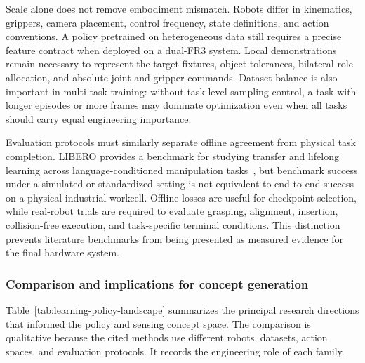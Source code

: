 Scale alone does not remove embodiment mismatch. Robots differ in kinematics, grippers, camera placement, control frequency, state definitions, and action conventions. A policy pretrained on heterogeneous data still requires a precise feature contract when deployed on a dual-FR3 system. Local demonstrations remain necessary to represent the target fixtures, object tolerances, bilateral role allocation, and absolute joint and gripper commands. Dataset balance is also important in multi-task training: without task-level sampling control, a task with longer episodes or more frames may dominate optimization even when all tasks should carry equal engineering importance.

Evaluation protocols must similarly separate offline agreement from physical task completion. LIBERO provides a benchmark for studying transfer and lifelong learning across language-conditioned manipulation tasks~\cite{libero}, but benchmark success under a simulated or standardized setting is not equivalent to end-to-end success on a physical industrial workcell. Offline losses are useful for checkpoint selection, while real-robot trials are required to evaluate grasping, alignment, insertion, collision-free execution, and task-specific terminal conditions. This distinction prevents literature benchmarks from being presented as measured evidence for the final hardware system.

\subsubsection{Comparison and implications for concept generation}

Table~\ref{tab:learning-policy-landscape} summarizes the principal research directions that informed the policy and sensing concept space. The comparison is qualitative because the cited methods use different robots, datasets, action spaces, and evaluation protocols. It records the engineering role of each family.

